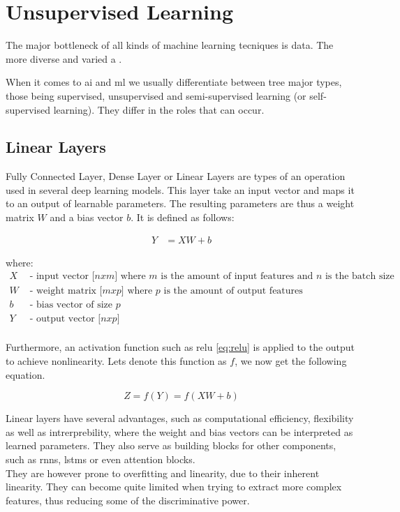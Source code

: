 \section{Unsupervised Learning}

The major bottleneck of all kinds of machine learning tecniques is data. The more diverse and varied a .

When it comes to \acrshort{ai} and \acrshort{ml} we usually differentiate between tree major types, those being supervised, unsupervised and semi-supervised learning (or self-supervised learning). They differ in the roles that can occur.


\subsection{Linear Layers}

Fully Connected Layer, Dense Layer or Linear Layers  are types of an operation used in several deep learning models. This layer take an input vector and maps it to an output of learnable parameters. The resulting parameters are thus a weight matrix $W$ and a bias vector $b$. It is defined as follows:

\begin{align}
    Y &= XW + b
\end{align}

where:
\begin{align*}
    X & \text{ - input vector [$n x m$] where $m$ is the amount of input features and $n$ is the batch size} \\
    W & \text{ - weight matrix [$m x p$] where $p$ is the amount of output features} \\
    b & \text{ - bias vector of size $p$} \\
    Y & \text{ - output vector [$n x p$]} \\
\end{align*}

Furthermore, an activation function such as \gls{relu} \ref{eq:relu} is applied to the output to achieve nonlinearity.
Lets denote this function as $f$, we now get the following equation.

\begin{equation}
    Z = f(Y) = f(XW+b)
\end{equation}

Linear layers have several advantages, such as computational efficiency, flexibility as well as intrerprebility, where the weight and bias vectors can be interpreted as learned parameters. They also serve as building blocks for other components, such as \acrshort{rnn}s, \acrshort{lstm}s or even attention blocks. \\ 

They are however prone to overfitting and linearity, due to their inherent linearity. They can become quite limited when trying to extract more complex features, thus reducing some of the discriminative power.